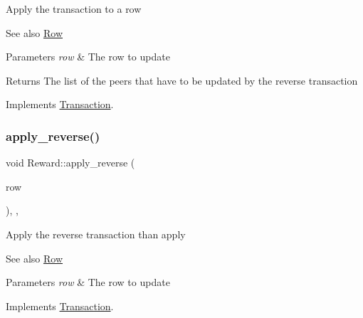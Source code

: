 Apply the transaction to a row \begin{DoxySeeAlso}{See also}
\mbox{\hyperlink{classRow}{Row}}
\end{DoxySeeAlso}

\begin{DoxyParams}{Parameters}
{\em row} & The row to update \\
\hline
\end{DoxyParams}
\begin{DoxyReturn}{Returns}
The list of the peers that have to be updated by the reverse transaction 
\end{DoxyReturn}


Implements \mbox{\hyperlink{classTransaction_a6ea269280c8cc641878f6e5775f270ca}{Transaction}}.

\mbox{\label{classReward_a494c9d6e0a220729f675fd6131cfb9af}} 
\subsubsection{\texorpdfstring{apply\+\_\+reverse()}{apply\_reverse()}}
{\footnotesize\ttfamily void Reward\+::apply\+\_\+reverse (\begin{DoxyParamCaption}\item[{\mbox{\hyperlink{classRow}{Row}} $\ast$}]{row }\end{DoxyParamCaption})\hspace{0.3cm}{\ttfamily [final]}, {\ttfamily [virtual]}, {\ttfamily [inherited]}}

Apply the reverse transaction than apply \begin{DoxySeeAlso}{See also}
\mbox{\hyperlink{classRow}{Row}}
\end{DoxySeeAlso}

\begin{DoxyParams}{Parameters}
{\em row} & The row to update \\
\hline
\end{DoxyParams}


Implements \mbox{\hyperlink{classTransaction_a1ef3b245f37c217f50f8f76fceebca4a}{Transaction}}.

\mbox{\label{classRewardTransaction_a414728d857fcf05295a7f3f4fa024dc1}} 
